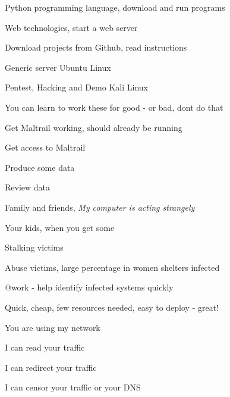 \documentclass[20pt,landscape,a4paper,footrule]{foils}
\begin{document}



\begin{list2}
\item Python programming language, download and run programs
\item Web technologies, start a web server
\item Download projects from Github, read instructions
\item Generic server Ubuntu Linux 
\item Pentest, Hacking and Demo Kali Linux 
\end{list2}

\vskip 5mm
\centerline{You can learn to work these for good - or bad, dont do that \smiley}







\begin{list2}
\item Get Maltrail working, should already be running
\item Get access to Maltrail
\item Produce some data
\item Review data
\end{list2}



\begin{list2}
\item Family and friends, \emph{My computer is acting strangely}
\item Your kids, when you get some
\item Stalking victims
\item Abuse victims, large percentage in women shelters infected
\item @work - help identify infected systems quickly
\end{list2}

Quick, cheap, few resources needed, easy to deploy - great!


\begin{list2}
\item You are using my network \smiley
\item I can read your traffic
\item I can redirect your traffic
\item I can censor your traffic or your DNS
\end{list2}
\end{document}
